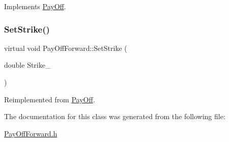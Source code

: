 Implements \hyperlink{classPayOff_a5ae17d82c233ef5568c8fb0539703000}{Pay\+Off}.

\hypertarget{classPayOffForward_a3c0f3d6400d4d8fb0339edfca3d5b2bb}{}\label{classPayOffForward_a3c0f3d6400d4d8fb0339edfca3d5b2bb} 
\subsubsection{\texorpdfstring{Set\+Strike()}{SetStrike()}}
{\footnotesize\ttfamily virtual void Pay\+Off\+Forward\+::\+Set\+Strike (\begin{DoxyParamCaption}\item[{double}]{Strike\+\_\+ }\end{DoxyParamCaption})\hspace{0.3cm}{\ttfamily [virtual]}}



Reimplemented from \hyperlink{classPayOff_a3fdefed95df90a057acfd697f5703e04}{Pay\+Off}.



The documentation for this class was generated from the following file\+:\begin{DoxyCompactItemize}
\item 
\hyperlink{PayOffForward_8h}{Pay\+Off\+Forward.\+h}\end{DoxyCompactItemize}
